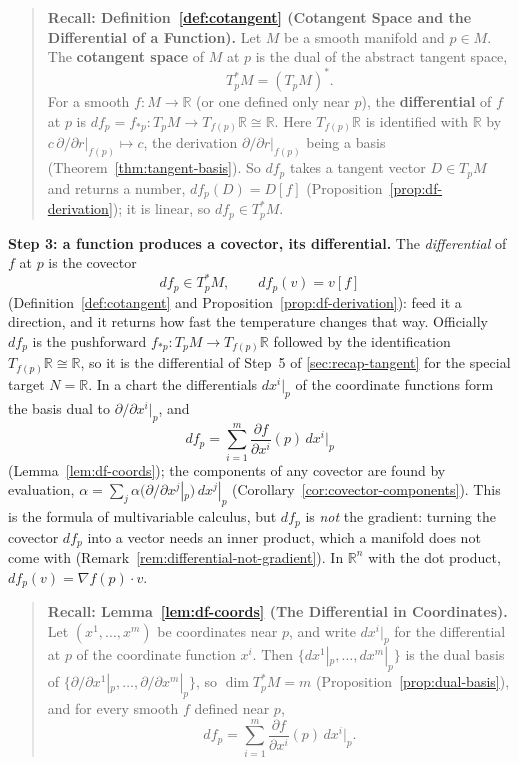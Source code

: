 \documentclass[11pt]{report}
\begin{document}
\begin{quote}
\textbf{Recall: Definition~\ref{def:cotangent} (Cotangent Space and the Differential of a Function).} Let $M$ be a smooth manifold and $p \in M$. The \textbf{cotangent space} of $M$ at $p$ is the dual of the abstract tangent space,
\[
T_p^*M = (T_pM)^* .
\]
For a smooth $f : M \to \mathbb{R}$ (or one defined only near $p$), the \textbf{differential} of $f$ at $p$ is $df_p = f_{*p} : T_pM \to T_{f(p)}\mathbb{R} \cong \mathbb{R}$. Here $T_{f(p)}\mathbb{R}$ is identified with $\mathbb{R}$ by $c\,\partial/\partial r|_{f(p)} \mapsto c$, the derivation $\partial/\partial r|_{f(p)}$ being a basis (Theorem~\ref{thm:tangent-basis}). So $df_p$ takes a tangent vector $D \in T_pM$ and returns a number, $df_p(D) = D[f]$ (Proposition~\ref{prop:df-derivation}); it is linear, so $df_p \in T_p^*M$.
\end{quote}

\textbf{Step 3: a function produces a covector, its differential.} The \emph{differential} of $f$ at $p$ is the covector
\[
df_p \in T_p^*M, \qquad df_p(v) = v[f]
\]
(Definition~\ref{def:cotangent} and Proposition~\ref{prop:df-derivation}): feed it a direction, and it returns how fast the temperature changes that way. Officially $df_p$ is the pushforward $f_{*p} : T_pM \to T_{f(p)}\mathbb{R}$ followed by the identification $T_{f(p)}\mathbb{R} \cong \mathbb{R}$, so it is the differential of Step~5 of \ref{sec:recap-tangent} for the special target $N = \mathbb{R}$. In a chart the differentials $dx^i|_p$ of the coordinate functions form the basis dual to $\partial/\partial x^i|_p$, and
\[
df_p = \sum_{i=1}^m \frac{\partial f}{\partial x^i}(p)\, dx^i\big|_p
\]
(Lemma~\ref{lem:df-coords}); the components of any covector are found by evaluation, $\alpha = \sum_j \alpha(\partial/\partial x^j|_p)\, dx^j|_p$ (Corollary~\ref{cor:covector-components}). This is the formula of multivariable calculus, but $df_p$ is \emph{not} the gradient: turning the covector $df_p$ into a vector needs an inner product, which a manifold does not come with (Remark~\ref{rem:differential-not-gradient}). In $\mathbb{R}^n$ with the dot product, $df_p(v) = \nabla f(p) \cdot v$.

\begin{quote}
\textbf{Recall: Lemma~\ref{lem:df-coords} (The Differential in Coordinates).} Let $(x^1, \ldots, x^m)$ be coordinates near $p$, and write $dx^i|_p$ for the differential at $p$ of the coordinate function $x^i$. Then $\{dx^1|_p, \ldots, dx^m|_p\}$ is the dual basis of $\{\partial/\partial x^1|_p, \ldots, \partial/\partial x^m|_p\}$, so $\dim T_p^*M = m$ (Proposition~\ref{prop:dual-basis}), and for every smooth $f$ defined near $p$,
\[
df_p = \sum_{i=1}^m \frac{\partial f}{\partial x^i}(p)\, dx^i\big|_p .
\]
\end{quote}
\end{document}
